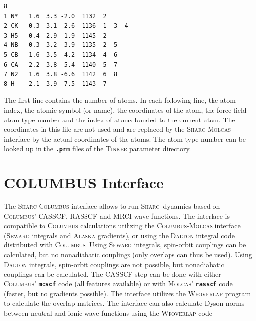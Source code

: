 \documentclass[a4paper,10pt,DIV=15,openany,twoside=false]{scrbook}
\newcommand{\sharc}{\textsc{Sharc}}
\newcommand{\ttt}[1]{\textbf{\texttt{#1}}}
\newenvironment{example}{
  \setlength{\OuterFrameSep}{3pt}
  \vspace{0mm}
  \definecolor{shadecolor}{HTML}{E4F4FF}
  \begin{shaded}
}{
  \end{shaded}
}
\begin{document}
\begin{example}
\begin{verbatim}
8
1 N*   1.6  3.3 -2.0  1132  2
2 CK   0.3  3.1 -2.6  1136  1  3  4
3 H5  -0.4  2.9 -1.9  1145  2
4 NB   0.3  3.2 -3.9  1135  2  5
5 CB   1.6  3.5 -4.2  1134  4  6
6 CA   2.2  3.8 -5.4  1140  5  7
7 N2   1.6  3.8 -6.6  1142  6  8
8 H    2.1  3.9 -7.5  1143  7
\end{verbatim}
\end{example}

The first line contains the number of atoms. In each following line, the atom index, the atomic symbol (or name), the coordinates of the atom, the force field atom type number and the index of atoms bonded to the current atom. The coordinates in this file are not used and are replaced by the \sharc-\textsc{Molcas} interface by the actual coordinates of the atoms. The atom type number can be looked up in the \ttt{.prm} files of the \textsc{Tinker} parameter directory. 







\section{COLUMBUS Interface}\label{sec:int:columbus}

The \sharc-\textsc{Columbus} interface allows to run \sharc\ dynamics based on \textsc{Columbus}' CASSCF, RASSCF and MRCI wave functions. 
The interface is compatible to \textsc{Columbus} calculations utilizing the \textsc{Columbus}-\textsc{Molcas} interface (\textsc{Seward} integrals and \textsc{Alaska} gradients), or using the \textsc{Dalton} integral code distributed with \textsc{Columbus}. 
Using \textsc{Seward} integrals, spin-orbit couplings can be calculated, but no nonadiabatic couplings (only overlaps can thus be used).
Using \textsc{Dalton} integrals, spin-orbit couplings are not possible, but nonadiabatic couplings can be calculated.
The CASSCF step can be done with either \textsc{Columbus}' \ttt{mcscf} code (all features available) or with \textsc{Molcas}' \ttt{rasscf} code (faster, but no gradients possible).
The interface utilizes the \textsc{Wfoverlap} program to calculate the overlap matrices.
The interface can also calculate Dyson norms between neutral and ionic wave functions using the \textsc{Wfoverlap} code.
\end{document}
